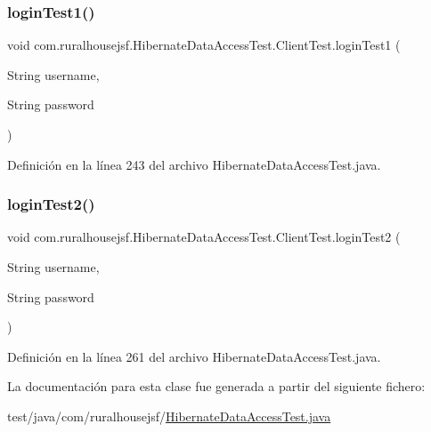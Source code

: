 \subsubsection{\texorpdfstring{loginTest1()}{loginTest1()}}
{\footnotesize\ttfamily void com.\+ruralhousejsf.\+Hibernate\+Data\+Access\+Test.\+Client\+Test.\+login\+Test1 (\begin{DoxyParamCaption}\item[{String}]{username,  }\item[{String}]{password }\end{DoxyParamCaption})\hspace{0.3cm}{\ttfamily [package]}}



Definición en la línea 243 del archivo Hibernate\+Data\+Access\+Test.\+java.

\mbox{\label{classcom_1_1ruralhousejsf_1_1_hibernate_data_access_test_1_1_client_test_a7ff9002a6599de1873e9ec87e7249c3f}} 
\subsubsection{\texorpdfstring{loginTest2()}{loginTest2()}}
{\footnotesize\ttfamily void com.\+ruralhousejsf.\+Hibernate\+Data\+Access\+Test.\+Client\+Test.\+login\+Test2 (\begin{DoxyParamCaption}\item[{String}]{username,  }\item[{String}]{password }\end{DoxyParamCaption})\hspace{0.3cm}{\ttfamily [package]}}



Definición en la línea 261 del archivo Hibernate\+Data\+Access\+Test.\+java.



La documentación para esta clase fue generada a partir del siguiente fichero\+:\begin{DoxyCompactItemize}
\item 
test/java/com/ruralhousejsf/\mbox{\hyperlink{_hibernate_data_access_test_8java}{Hibernate\+Data\+Access\+Test.\+java}}\end{DoxyCompactItemize}
